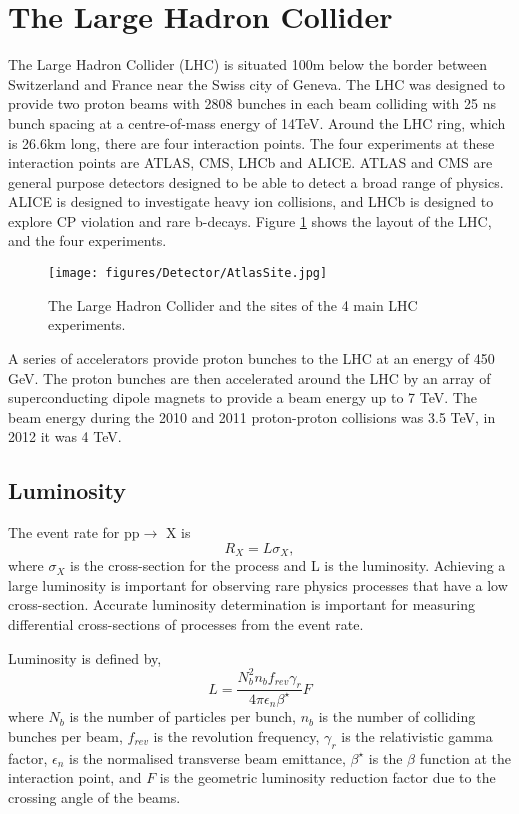 \section{The Large Hadron Collider}
\label{sec:Det:LHC}

The Large Hadron Collider (LHC) is situated 100m below the border between Switzerland and France near the Swiss city of Geneva. 
The LHC was designed to provide two proton beams with 2808 bunches in each beam colliding with 25 ns bunch spacing at a centre-of-mass energy of 14TeV.
Around the LHC ring, which is 26.6km long, there are four interaction points. 
The four experiments at these interaction points are ATLAS, CMS, LHCb and ALICE.
ATLAS and CMS are general purpose detectors designed to be able to detect a broad range of physics. ALICE is designed to investigate heavy ion collisions, and LHCb is designed to explore CP violation and rare b-decays.
Figure \ref{Det:LHC} shows the layout of the LHC, and the four experiments.

\begin{figure}
\centering
\texttt{[image: figures/Detector/AtlasSite.jpg]}
  \caption[The Large Hadron Collider complex]{
The Large Hadron Collider and the sites of the 4 main LHC experiments.
\label{Det:LHC}
}
\end{figure}

A series of accelerators provide proton bunches to the LHC at an energy of 450 GeV.
The proton bunches are then accelerated around the LHC by an array of superconducting dipole magnets to provide a beam energy up to 7 TeV.
The beam energy during the 2010 and 2011 proton-proton collisions was 3.5 TeV, in 2012 it was 4 TeV.


\subsection{Luminosity}

The event rate for pp$\rightarrow$ X is
\begin{equation}
R_X = L \sigma_X,
\label{Det:Lumi}
\end{equation}
where $\sigma_X$ is the cross-section for the process and L is the luminosity.
Achieving a large luminosity is important for observing rare physics processes that have a low cross-section. 
Accurate luminosity determination is important for measuring differential cross-sections of processes from the event rate. 

Luminosity is defined by,
\begin{equation}
L=\frac{N_b^2n_bf_{rev}\gamma_r}{4\pi\epsilon_n\beta^\star}F
\label{Det:Lumi}
\end{equation}
where $N_b$ is the number of particles per bunch, $n_b$ is the number of colliding bunches per beam, $f_{rev}$ is the revolution frequency, $\gamma_r$ is the relativistic gamma factor, $\epsilon_n$ is the normalised transverse beam emittance, $\beta^\star$ is the $\beta$ function at the interaction point, and $F$ is the geometric luminosity reduction factor due to the crossing angle of the beams.


